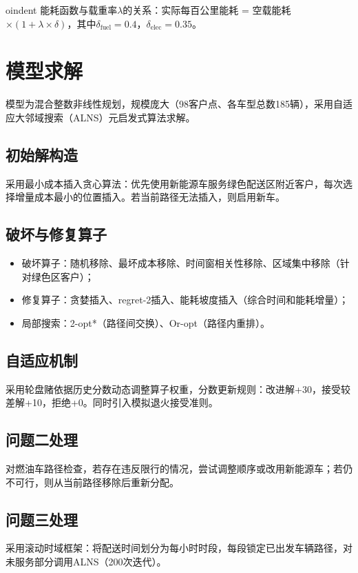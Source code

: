 \documentclass[11pt,a4paper]{article}
\begin{document}
oindent 能耗函数与载重率$\lambda$的关系：实际每百公里能耗 = 空载能耗$\times(1+\lambda\times\delta)$，其中$\delta_{\text{fuel}}=0.4$，$\delta_{\text{elec}}=0.35$。

\section{模型求解}

模型为混合整数非线性规划，规模庞大（98客户点、各车型总数185辆），采用自适应大邻域搜索（ALNS）元启发式算法求解。

\subsection{初始解构造}
采用最小成本插入贪心算法：优先使用新能源车服务绿色配送区附近客户，每次选择增量成本最小的位置插入。若当前路径无法插入，则启用新车。

\subsection{破坏与修复算子}
\begin{itemize}
    \item 破坏算子：随机移除、最坏成本移除、时间窗相关性移除、区域集中移除（针对绿色区客户）；
    \item 修复算子：贪婪插入、regret-2插入、能耗坡度插入（综合时间和能耗增量）；
    \item 局部搜索：2-opt*（路径间交换）、Or-opt（路径内重排）。
\end{itemize}

\subsection{自适应机制}
采用轮盘赌依据历史分数动态调整算子权重，分数更新规则：改进解+30，接受较差解+10，拒绝+0。同时引入模拟退火接受准则。

\subsection{问题二处理}
对燃油车路径检查，若存在违反限行的情况，尝试调整顺序或改用新能源车；若仍不可行，则从当前路径移除后重新分配。

\subsection{问题三处理}
采用滚动时域框架：将配送时间划分为每小时时段，每段锁定已出发车辆路径，对未服务部分调用ALNS（200次迭代）。
\end{document}

